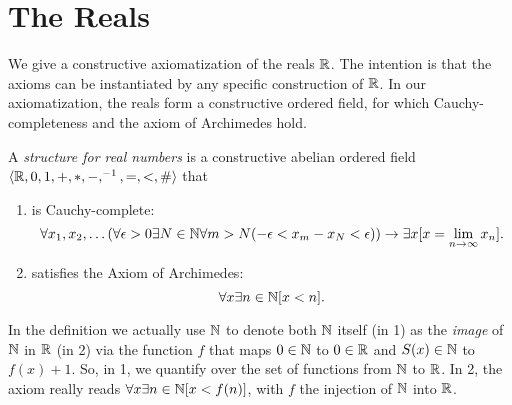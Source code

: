 \section{The Reals}
We give a constructive axiomatization of the reals $\mathbb{R}$. The
intention is that the axioms can be instantiated by any specific
construction of $\mathbb{R}$. In our axiomatization, the reals form a
constructive ordered field, for which Cauchy-completeness and the
axiom of Archimedes hold.

\begin{definition} A {\em structure for real numbers\/} is a
constructive abelian ordered field 
$\langle \mathbb{R}, 0, 1, +, *, -, ^{-1}, =, <, \mathrel{\#}\rangle$ that
\begin{enumerate}
\item is Cauchy-complete:
$$\forall x_1, x_2,\ldots 
        (\forall \epsilon>0 \exists N\in\mathbb{N} \forall m>N(-\epsilon <x_m - x_N <
        \epsilon))
        \rightarrow
        \exists x [x = \lim_{n\rightarrow\infty} x_n].$$
\item satisfies the Axiom of Archimedes:
$$\forall x\exists n\in\mathbb{N}[x<n].$$
\end{enumerate}
\end{definition}

\begin{remark}
 In the definition we actually use $\mathbb{N}$ to denote both $\mathbb{N}$
  itself (in 1) as the {\em image\/} of
  $\mathbb{N}$ in $\mathbb{R}$ (in 2) via the function $f$ that maps $0\in\mathbb{N}$ to $0\in\mathbb{R}$
  and $S(x) \in \mathbb{N}$ to $f(x) +1$. So, in 1, we quantify over the set
  of functions from $\mathbb{N}$ to $\mathbb{R}$. In 2, the axiom really reads
  $\forall x\exists n\in\mathbb{N}[x<f(n)]$, with $f$ the injection of $\mathbb{N}$
  into $\mathbb{R}$.
\end{remark}




